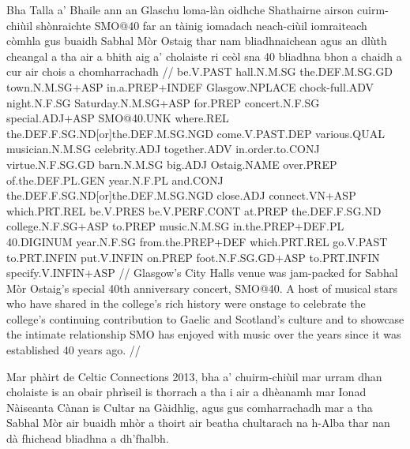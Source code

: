 \documentclass[a4paper,10pt]{article}
\begin{document}
\vspace{4mm}
\gla Bha Talla a' Bhaile {ann an} Glaschu loma-làn oidhche Shathairne airson cuirm-chiùil shònraichte SMO@40 far an tàinig iomadach neach-ciùil iomraiteach còmhla gus buaidh Sabhal Mòr Ostaig thar nam bliadhnaichean agus an dlùth cheangal a tha {air a bhith} aig a' cholaiste ri ceòl sna 40 bliadhna bhon a chaidh a cur air chois a chomharrachadh  //
\glb be.V.PAST hall.N.M.SG the.DEF.M.SG.GD town.N.M.SG+ASP in.a.PREP+INDEF Glasgow.NPLACE chock-full.ADV night.N.F.SG Saturday.N.M.SG+ASP for.PREP concert.N.F.SG special.ADJ+ASP SMO@40.UNK where.REL the.DEF.F.SG.ND[or]the.DEF.M.SG.NGD come.V.PAST.DEP various.QUAL musician.N.M.SG celebrity.ADJ together.ADV in.order.to.CONJ virtue.N.F.SG.GD barn.N.M.SG big.ADJ Ostaig.NAME over.PREP of.the.DEF.PL.GEN year.N.F.PL and.CONJ the.DEF.F.SG.ND[or]the.DEF.M.SG.NGD close.ADJ connect.VN+ASP which.PRT.REL be.V.PRES be.V.PERF.CONT at.PREP the.DEF.F.SG.ND college.N.F.SG+ASP to.PREP music.N.M.SG in.the.PREP+DEF.PL 40.DIGINUM year.N.F.SG from.the.PREP+DEF which.PRT.REL go.V.PAST to.PRT.INFIN put.V.INFIN on.PREP foot.N.F.SG.GD+ASP to.PRT.INFIN specify.V.INFIN+ASP  //
\glft Glasgow's City Halls venue was jam-packed for Sabhal Mòr Ostaig's special 40th anniversary concert, SMO@40. A host of musical stars who have shared in the college's rich history were onstage to celebrate the college's continuing contribution to Gaelic and Scotland's culture and to showcase the intimate relationship SMO has enjoyed with music over the years since it was established 40 years ago. //
\endgl
\xe

\ex
\begingl
\glpre Mar phàirt de Celtic Connections 2013, bha a' chuirm-chiùil mar urram dhan cholaiste is an obair phrìseil is thorrach a tha i air a dhèanamh mar Ionad Nàiseanta Cànan is Cultar na Gàidhlig, agus gus comharrachadh mar a tha Sabhal Mòr air buaidh mhòr a thoirt air beatha chultarach na h-Alba thar nan dà fhichead bliadhna a dh'fhalbh. 
\end{document}

